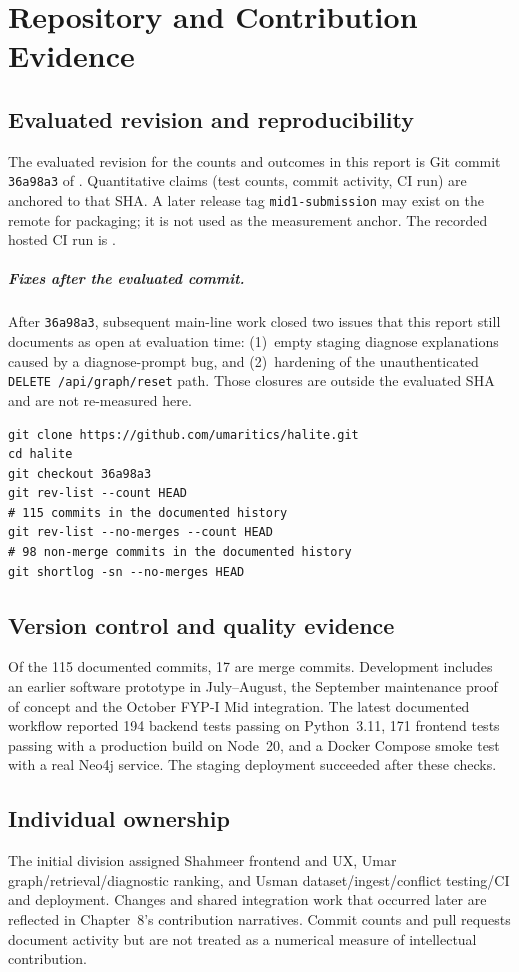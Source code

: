 \chapter{Repository and Contribution Evidence}

\section*{Evaluated revision and reproducibility}

The evaluated revision for the counts and outcomes in this report is Git commit \texttt{36a98a3} of . Quantitative claims (test counts, commit activity, CI run) are anchored to that SHA. A later release tag \texttt{mid1-submission} may exist on the remote for packaging; it is not used as the measurement anchor. The recorded hosted CI run is .

\paragraph{Fixes after the evaluated commit.}
After \texttt{36a98a3}, subsequent main-line work closed two issues that this report still documents as open at evaluation time: (1)~empty staging diagnose explanations caused by a diagnose-prompt bug, and (2)~hardening of the unauthenticated \texttt{DELETE /api/graph/reset} path. Those closures are outside the evaluated SHA and are not re-measured here.

\begin{verbatim}
git clone https://github.com/umaritics/halite.git
cd halite
git checkout 36a98a3
git rev-list --count HEAD
# 115 commits in the documented history
git rev-list --no-merges --count HEAD
# 98 non-merge commits in the documented history
git shortlog -sn --no-merges HEAD
\end{verbatim}

\section*{Version control and quality evidence}

Of the 115 documented commits, 17 are merge commits. Development includes an earlier software prototype in July--August, the September maintenance proof of concept and the October FYP-I Mid integration. The latest documented workflow reported 194 backend tests passing on Python~3.11, 171 frontend tests passing with a production build on Node~20, and a Docker Compose smoke test with a real Neo4j service. The staging deployment succeeded after these checks.

\section*{Individual ownership}

The initial division assigned Shahmeer frontend and UX, Umar graph/retrieval/diagnostic ranking, and Usman dataset/ingest/conflict testing/CI and deployment. Changes and shared integration work that occurred later are reflected in Chapter~8's contribution narratives. Commit counts and pull requests document activity but are not treated as a numerical measure of intellectual contribution.
